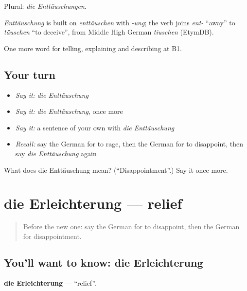 Plural: \emph{die Enttäuschungen}.

\begin{cousinweb}
\emph{Enttäuschung} is built on \emph{enttäuschen} with \emph{-ung}; the verb joins \emph{ent-} \textquotedblleft{}away\textquotedblright{} to \emph{täuschen} \textquotedblleft{}to deceive\textquotedblright{}, from Middle High German \emph{tiuschen} (EtymDB).
\end{cousinweb}

\begin{grammarlens}[title={What you've built}]
One more word for telling, explaining and describing at B1.
\end{grammarlens}

\subsection*{Your turn}
\begin{itemize}
\raggedright
  \item \emph{Say it:} \emph{die Enttäuschung}
  \item \emph{Say it:} \emph{die Enttäuschung}, once more
  \item \emph{Say it:} a sentence of your own with \emph{die Enttäuschung}
  \item \emph{Recall:} say the German for to rage, then the German for to disappoint, then say \emph{die Enttäuschung} again
\end{itemize}

\begin{tcolorbox}[breakable,colback=teal!4,colframe=teal!35!black,title={Before you move on}]
What does die Enttäuschung mean? (\textquotedblleft{}Disappointment\textquotedblright{}.) Say it once more.
\end{tcolorbox}
\section[die Erleichterung]{die Erleichterung — relief}

\label{lesson:GE-C469-erleichterung}



\begin{quote}
Before the new one: say the German for to disappoint, then the German for disappointment.
\end{quote}

\subsection*{You'll want to know: die Erleichterung}
\textbf{die Erleichterung} — \textquotedblleft{}relief\textquotedblright{}.

